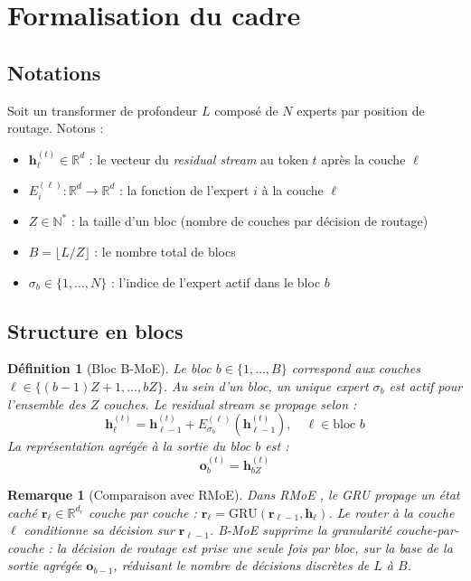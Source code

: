\documentclass[10pt,a4paper]{article}
\newtheorem{definition}{Définition}
\newtheorem{remark}{Remarque}
\begin{document}
\section{Formalisation du cadre}

\subsection{Notations}

Soit un transformer de profondeur $L$ composé de $N$ experts par position de routage. Notons :
\begin{itemize}
  \item $\mathbf{h}_\ell^{(t)} \in \mathbb{R}^d$ : le vecteur du \textit{residual stream} au token $t$ après la couche $\ell$
  \item $E_i^{(\ell)} : \mathbb{R}^d \to \mathbb{R}^d$ : la fonction de l'expert $i$ à la couche $\ell$
  \item $Z \in \mathbb{N}^*$ : la taille d'un bloc (nombre de couches par décision de routage)
  \item $B = \lfloor L/Z \rfloor$ : le nombre total de blocs
  \item $\sigma_b \in \{1, \ldots, N\}$ : l'indice de l'expert actif dans le bloc $b$
\end{itemize}

\subsection{Structure en blocs}

\begin{definition}[Bloc B-MoE]
Le bloc $b \in \{1, \ldots, B\}$ correspond aux couches $\ell \in \{(b-1)Z+1, \ldots, bZ\}$. Au sein d'un bloc, un unique expert $\sigma_b$ est actif pour l'ensemble des $Z$ couches. Le residual stream se propage selon :
\begin{equation}
  \mathbf{h}_\ell^{(t)} = \mathbf{h}_{\ell-1}^{(t)} + E_{\sigma_b}^{(\ell)}\!\left(\mathbf{h}_{\ell-1}^{(t)}\right), \quad \ell \in \text{bloc } b
\end{equation}
La représentation agrégée à la sortie du bloc $b$ est :
\begin{equation}
  \mathbf{o}_b^{(t)} = \mathbf{h}_{bZ}^{(t)}
\end{equation}
\end{definition}

\begin{remark}[Comparaison avec RMoE]
Dans RMoE \cite{qiu2025rmoe}, le GRU propage un état caché $\mathbf{r}_\ell \in \mathbb{R}^{d_r}$ couche par couche : $\mathbf{r}_\ell = \mathrm{GRU}(\mathbf{r}_{\ell-1}, \mathbf{h}_\ell)$. Le router à la couche $\ell$ conditionne sa décision sur $\mathbf{r}_{\ell-1}$. B-MoE supprime la granularité couche-par-couche : la décision de routage est prise une seule fois par bloc, sur la base de la sortie agrégée $\mathbf{o}_{b-1}$, réduisant le nombre de décisions discrètes de $L$ à $B$.
\end{remark}
\end{document}
